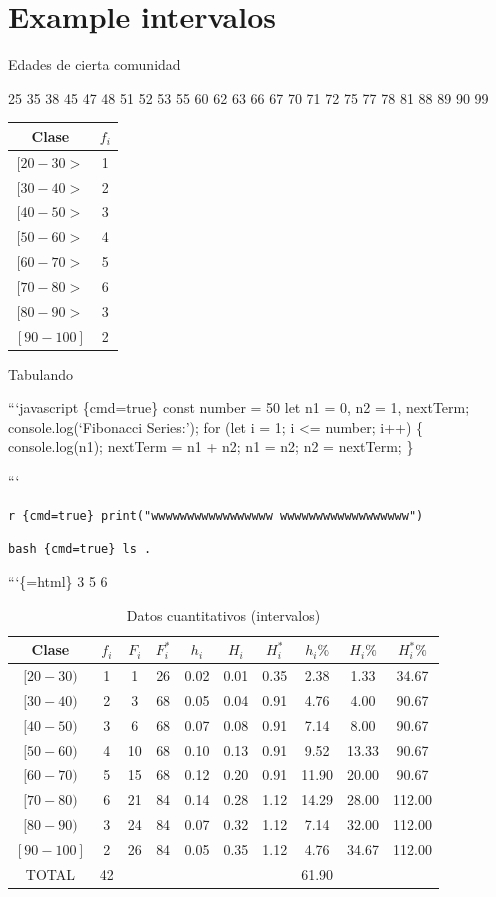 \documentclass[10pt,]{krantz}
\theoremstyle{definition}
\theoremstyle{definition}
\theoremstyle{definition}
\theoremstyle{definition}
\theoremstyle{remark}
\begin{document}
\hypertarget{example-intervalos}{%
\section{Example intervalos}\label{example-intervalos}}

Edades de cierta comunidad

25
35 38
45 47 48
51 52 53 55
60 62 63 66 67
70 71 72 75 77 78
81 88 89
90 99

\begin{longtable}[]{@{}cc@{}}
\toprule
Clase & \(f_i\)\tabularnewline
\midrule
\endhead
\([20-30>\) & 1\tabularnewline
\([30-40>\) & 2\tabularnewline
\([40-50>\) & 3\tabularnewline
\([50-60>\) & 4\tabularnewline
\([60-70>\) & 5\tabularnewline
\([70-80>\) & 6\tabularnewline
\([80-90>\) & 3\tabularnewline
\([90-100]\) & 2\tabularnewline
\bottomrule
\end{longtable}

Tabulando

```javascript \{cmd=true\}
const number = 50
let n1 = 0, n2 = 1, nextTerm; console.log(`Fibonacci Series:'); for (let i = 1; i \textless{}= number; i++) \{ console.log(n1); nextTerm = n1 + n2; n1 = n2; n2 = nextTerm; \}

```

\texttt{r\ \{cmd=true\}\ print("wwwwwwwwwwwwwwwww\ wwwwwwwwwwwwwwwwww")}

\texttt{bash\ \{cmd=true\}\ ls\ .}

```\{=html\}
3
5
6

\begin{longtable}[t]{cccccccccc}
\caption{\label{tab:cuantitativa}Datos cuantitativos (intervalos)}\\
\toprule
Clase & $f_i$ & $F_i$ & $F_i^*$ & $h_i$ & $H_i$ & $H_i^*$ & $h_i\%$ & $H_i\%$ & $H_i^*\%$\\
\midrule
$[20-30)$ & 1 & 1 & 26 & 0.02 & 0.01 & 0.35 & 2.38 & 1.33 & 34.67\\
$[30-40)$ & 2 & 3 & 68 & 0.05 & 0.04 & 0.91 & 4.76 & 4.00 & 90.67\\
$[40-50)$ & 3 & 6 & 68 & 0.07 & 0.08 & 0.91 & 7.14 & 8.00 & 90.67\\
$[50-60)$ & 4 & 10 & 68 & 0.10 & 0.13 & 0.91 & 9.52 & 13.33 & 90.67\\
$[60-70)$ & 5 & 15 & 68 & 0.12 & 0.20 & 0.91 & 11.90 & 20.00 & 90.67\\
$[70-80)$ & 6 & 21 & 84 & 0.14 & 0.28 & 1.12 & 14.29 & 28.00 & 112.00\\
$[80-90)$ & 3 & 24 & 84 & 0.07 & 0.32 & 1.12 & 7.14 & 32.00 & 112.00\\
$[90-100]$ & 2 & 26 & 84 & 0.05 & 0.35 & 1.12 & 4.76 & 34.67 & 112.00\\
TOTAL & 42 &  &  &  &  &  & 61.90 &  & \\
\bottomrule
\end{longtable}
\end{document}
